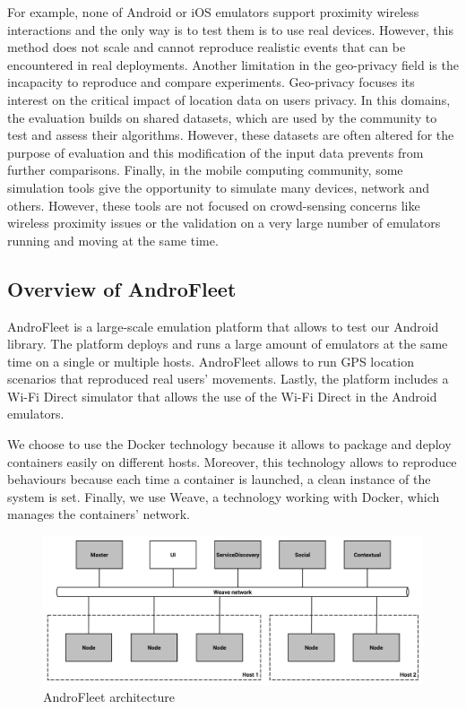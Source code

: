 For example, none of Android or iOS emulators support proximity wireless interactions and the only
way is to test them is to use real devices.
However, this method does not scale and cannot reproduce realistic events that can be encountered in real deployments. 
Another limitation in the geo-privacy field is the incapacity to reproduce and compare experiments. Geo-privacy focuses its interest on the critical impact of location data on users privacy. 
In this domains, the evaluation builds on shared datasets, which are used by the community to test and assess their algorithms. 
However, these datasets are often altered for the purpose of evaluation and this modification of the input data prevents from further comparisons.
Finally, in the mobile computing community, some simulation tools give the opportunity to simulate many devices, network and others. 
However, these tools are not focused on crowd-sensing concerns like wireless proximity issues or the validation on a very large number of emulators running and moving at the same time.


\subsection{Overview of AndroFleet}

AndroFleet is a large-scale emulation platform that allows to test our Android library.
The platform deploys and runs a large amount of emulators at the same time on a single or multiple hosts.
AndroFleet allows to run GPS location scenarios that reproduced real users' movements.
Lastly, the platform includes a Wi-Fi Direct simulator that allows the use of the Wi-Fi Direct in the Android emulators.

We choose to use the Docker technology because it allows to package and deploy containers easily on different hosts.
Moreover, this technology allows to reproduce behaviours because each time a container is launched, a clean instance of the system is set.
Finally, we use Weave, a technology working with Docker, which manages the containers' network.

\begin{figure}[h]
	\centering
	\includegraphics[width=\textwidth]{figures/androfleet}
	\caption{\label{AndroFleet} AndroFleet architecture}
\end{figure}


